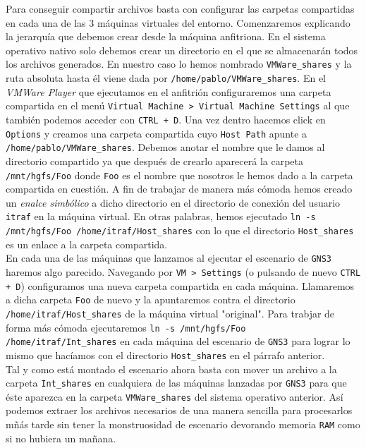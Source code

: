 \documentclass[11pt]{article}
\begin{document}
            Para conseguir compartir archivos basta con configurar las carpetas compartidas en cada una de las $3$ máquinas virtuales del entorno. Comenzaremos explicando la jerarquía que debemos crear desde la máquina anfitriona. En el sistema operativo nativo solo debemos crear un directorio en el que se almacenarán todos los archivos generados. En nuestro caso lo hemos nombrado \texttt{VMWare\_shares} y la ruta absoluta hasta él viene dada por \texttt{/home/pablo/VMWare\_shares}. En el \textit{VMWare Player} que ejecutamos en el anfitrión configuraremos una carpeta compartida en el menú \texttt{Virtual Machine > Virtual Machine Settings} al que también podemos acceder con \texttt{CTRL + D}. Una vez dentro hacemos click en \texttt{Options} y creamos una carpeta compartida cuyo \texttt{Host Path} apunte a \texttt{/home/pablo/VMWare\_shares}. Debemos anotar el nombre que le damos al directorio compartido ya que después de crearlo aparecerá la carpeta \texttt{/mnt/hgfs/Foo} donde \texttt{Foo} es el nombre que nosotros le hemos dado a la carpeta compartida en cuestión. A fin de trabajar de manera más cómoda hemos creado un \textit{enalce simbólico} a dicho directorio en el directorio de conexión del usuario \texttt{itraf} en la máquina virtual. En otras palabras, hemos ejecutado \texttt{ln -s /mnt/hgfs/Foo /home/itraf/Host\_shares} con lo que el directorio \texttt{Host\_shares} es un enlace a la carpeta compartida.\\

            En cada una de las máquinas que lanzamos al ejecutar el escenario de \texttt{GNS3} haremos algo parecido. Navegando por \texttt{VM > Settings} (o pulsando de nuevo \texttt{CTRL + D}) configuramos una nueva carpeta compartida en cada máquina. Llamaremos a dicha carpeta \texttt{Foo} de nuevo y la apuntaremos contra el directorio \texttt{/home/itraf/Host\_shares} de la máquina virtual "original". Para trabjar de forma más cómoda ejecutaremos \texttt{ln -s /mnt/hgfs/Foo /home/itraf/Int\_shares} en cada máquina del escenario de \texttt{GNS3} para lograr lo mismo que hacíamos con el directorio \texttt{Host\_shares} en el párrafo anterior.\\

            Tal y como está montado el escenario ahora basta con mover un archivo a la carpeta \texttt{Int\_shares} en cualquiera de las máquinas lanzadas por \texttt{GNS3} para que éste aparezca en la carpeta \texttt{VMWare\_shares} del sistema operativo anterior. Así podemos extraer los archivos necesarios de una manera sencilla para procesarlos mñás tarde sin tener la monstruosidad de escenario devorando memoria \texttt{RAM} como si no hubiera un mañana.
\end{document}
